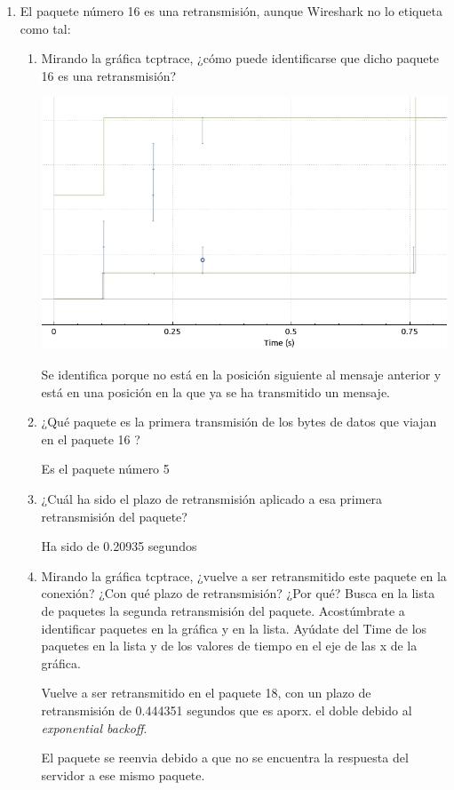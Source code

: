\documentclass[12pt, a4paper]{report}
\begin{document}
\begin{enumerate}
	\item El paquete número 16 es una retransmisión, aunque Wireshark no lo etiqueta como tal:

		\begin{enumerate}[label=\alph*]
			\item Mirando la gráfica tcptrace, ¿cómo puede identificarse que dicho paquete 16 es una retransmisión?
			
			\includegraphics*[width=128mm, scale=0.5, center]{ejercicio3}
			
			Se identifica porque no está en la posición siguiente al mensaje anterior y está en una posición en la que ya se ha transmitido un mensaje.
			\item ¿Qué paquete es la primera transmisión de los bytes de datos que viajan en el paquete 16 ?
			
			Es el paquete número 5
			\item ¿Cuál ha sido el plazo de retransmisión aplicado a esa primera retransmisión del paquete?
			
			Ha sido de 0.20935 segundos
			\item Mirando la gráfica tcptrace, ¿vuelve a ser retransmitido este paquete en la conexión? ¿Con qué plazo de retransmisión? ¿Por qué? Busca en la lista de paquetes la segunda retransmisión del paquete. Acostúmbrate a identificar paquetes en la gráfica y en la lista. Ayúdate del Time de los paquetes en la lista y de los valores de tiempo en el eje de las x de la gráfica.
			
			Vuelve a ser retransmitido en el paquete 18, con un plazo de retransmisión de 0.444351 segundos que es aporx. el doble debido al \textit{exponential backoff}.
			
			El paquete se reenvia debido a que no se encuentra la respuesta del servidor a ese mismo paquete.
		\end{enumerate}


\end{enumerate}
\end{document}
